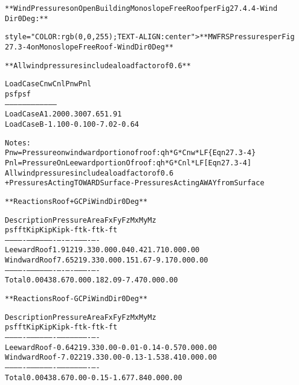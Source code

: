 \documentclass[12pt,notitle,letterpaper]{report}
\renewenvironment{quote}
  {\small\list{}{\rightmargin=0cm \leftmargin=0cm}%
   \item\relax}
  {\endlist}
\begin{document}
\begin{quote}
\begin{alltt}
**Wind Pressures on Open Building Monoslope Free Roof per Fig 27.4.4 - Wind
Dir 0 Deg:**


style="COLOR: rgb(0,0,255); TEXT-ALIGN: center"> **MWFRS Pressures per Fig
27.3-4 on Monoslope Free Roof - Wind Dir 0 Deg**

**All wind pressures include a load factor of 0.6**



          Load Case             Cnw              Cnl              Pnw             Pnl
                                                                  psf             psf
         -----------           ------           ------           -----           -----
         Load Case A            1.200            0.300            7.65            1.91
         Load Case B           -1.100           -0.100           -7.02           -0.64



       Notes:
       Pnw   = Pressure on windward portion of roof:  qh*G*Cnw*LF    \{Eqn 27.3-4\}
       Pnl   = Pressure On Leeward portion Of roof:   qh*G*Cnl*LF    [Eqn 27.3-4]
       All wind pressures include a load factor of 0.6
       + Pressures Acting TOWARD Surface          - Pressures Acting AWAY from Surface



**Reactions Roof +GCPi Wind Dir 0 Deg**



          Description    Pressure    Area     Fx     Fy      Fz      Mx       My      Mz
                           psf        ft     Kip    Kip     Kip     k-ft     k-ft    k-ft
         -------------   --------   ------   ----   ----    ----    -----    ----    ----
         Leeward Roof        1.91   219.33   0.00   0.04    0.42     1.71    0.00    0.00
         Windward Roof       7.65   219.33   0.00   0.15    1.67    -9.17    0.00    0.00
         -------------   --------   ------   ----   ----    ----    -----    ----    ----
         Total               0.00   438.67   0.00   0.18    2.09    -7.47    0.00    0.00



**Reactions Roof -GCPi Wind Dir 0 Deg**



          Description    Pressure    Area     Fx     Fy      Fz      Mx       My      Mz
                           psf        ft     Kip     Kip     Kip    k-ft     k-ft    k-ft
         -------------   --------   ------   ----   -----   -----   -----    ----    ----
         Leeward Roof       -0.64   219.33   0.00   -0.01   -0.14   -0.57    0.00    0.00
         Windward Roof      -7.02   219.33   0.00   -0.13   -1.53    8.41    0.00    0.00
         -------------   --------   ------   ----   -----   -----   -----    ----    ----
         Total               0.00   438.67   0.00   -0.15   -1.67    7.84    0.00    0.00




\end{alltt}
\end{quote}
\end{document}
